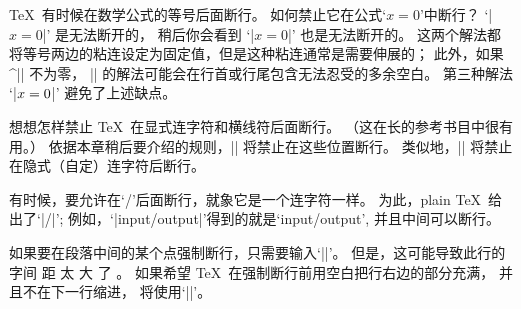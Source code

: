\dangerexercise  \TeX\ 有时候在数学公式的等号后面断行。%
如何禁止它在公式`$x=0$'中断行？
\answer `|\hbox{$x=0$}|' 是无法断开的，
稍后你会看到 `|${x=0}$|' 也是无法断开的。
这两个解法都将等号两边的粘连设定为固定值，但是这种粘连通常是需要伸展的；
此外，如果 ^|\mathsurround| 不为零，
|\hbox| 的解法可能会在行首或行尾包含无法忍受的多余空白。
第三种解法 `|$x=\nobreak0$|' 避免了上述缺点。

\ddangerexercise 想想怎样禁止 \TeX\ 在显式连字符和横线符后面断行。%
（这在长的参考书目中很有用。）
\answer 依据本章稍后要介绍的规则，|| 将禁止在这些位置断行。
类似地，|| 将禁止在隐式（自定）连字符后断行。

有时候，要允许在`/'后面断行，就象它是一个连字符一样。%
为此，plain \TeX\ 给出了`|\slash|';
例如，`|input\slash output|'得到的就是`input\slash output', 并且中间可以断行。

{
\1如果要在段落中间的某个点强制断行，只需要输入`|\break|'。%
但是，这可能导致此行的字间 距 太 大 了 。\break%
如果希望 \TeX\ 在强制断行前用空白把行右边的部分充满，\hfil\break
并且不在下一行缩进，
将使用`|\hfil\break|'。\par
}

